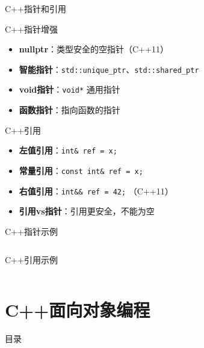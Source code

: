\documentclass[UTF8,aspectratio=169]{beamer}
\begin{document}
\begin{frame}{C++指针和引用}
    \begin{ytublock}{C++指针增强}
        \begin{itemize}
            \item \textbf{nullptr}：类型安全的空指针（C++11）
            \item \textbf{智能指针}：\texttt{std::unique\_ptr}、\texttt{std::shared\_ptr}
            \item \textbf{void指针}：\texttt{void*} 通用指针
            \item \textbf{函数指针}：指向函数的指针
        \end{itemize}
    \end{ytublock}

    \begin{ytublock}{C++引用}
        \begin{itemize}
            \item \textbf{左值引用}：\texttt{int\& ref = x;}
            \item \textbf{常量引用}：\texttt{const int\& ref = x;}
            \item \textbf{右值引用}：\texttt{int\&\& ref = 42;} （C++11）
            \item \textbf{引用vs指针}：引用更安全，不能为空
        \end{itemize}
    \end{ytublock}
\end{frame}

\begin{frame}[fragile]{C++指针示例}
    \inputminted[firstline=1,lastline=18]{cpp}{code/cpp_pointer_example.cpp}
\end{frame}

\begin{frame}[fragile]{C++引用示例}
    \inputminted[firstline=1,lastline=18]{cpp}{code/cpp_reference_example.cpp}
\end{frame}

\section{C++面向对象编程}
\begin{frame}{目录}
    \begin{multicols}{2}
        \tableofcontents[currentsection]
    \end{multicols}
\end{frame}
\end{document}
